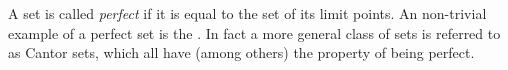 \documentclass[12pt]{article}
\begin{document}
A set is called \textit{perfect} if it is equal to the set of its limit points. An non-trivial example of a perfect set is the . In fact a more general class of sets is referred to as Cantor sets, which all have (among others) the property of being perfect.
\end{document}
